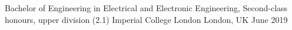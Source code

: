 
\begin{cventries}
  \cventry
    {Bachelor of Engineering in Electrical and Electronic Engineering, Second-class honours, upper division (2.1)} %
    {Imperial College London} %
    {London, UK} %
    {June 2019} %
    {
    }
\end{cventries}

